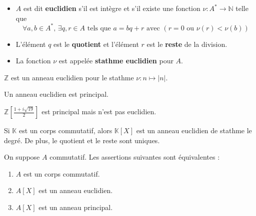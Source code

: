 
  \begin{definition}
    \begin{itemize}
      \item $A$ est dit \textbf{euclidien} s'il est intègre et s'il existe une fonction $\nu : A^* \rightarrow \mathbb{N}$ telle que
      \[ \forall a, b \in A^*, \, \exists q, r \in A \text{ tels que } a = bq+r \text{ avec } (r = 0 \text{ ou } \nu(r) < \nu(b)) \]
      \item L'élément $q$ est le \textbf{quotient} et l'élément $r$ est le \textbf{reste} de la division.
      \item La fonction $\nu$ est appelée \textbf{stathme euclidien} pour $A$.
    \end{itemize}
  \end{definition}

  \begin{example}
    $\mathbb{Z}$ est un anneau euclidien pour le stathme $\nu : n \mapsto \vert n \vert$.
  \end{example}

  \begin{proposition}
    Un anneau euclidien est principal.
  \end{proposition}


  \begin{cexample}
    $\mathbb{Z} \left[ \frac{1 + i\sqrt{19}}{2} \right]$ est principal mais n'est pas euclidien.
  \end{cexample}


  \begin{theorem}
    Si $\mathbb{K}$ est un corps commutatif, alors $\mathbb{K}[X]$ est un anneau euclidien de stathme le degré. De plus, le quotient et le reste sont uniques.
  \end{theorem}

  \begin{corollary}
    On suppose $A$ commutatif. Les assertions suivantes sont équivalentes :
    \begin{enumerate}[label=(\roman*)]
      \item $A$ est un corps commutatif.
      \item $A[X]$ est un anneau euclidien.
      \item $A[X]$ est un anneau principal.
    \end{enumerate}
  \end{corollary}


